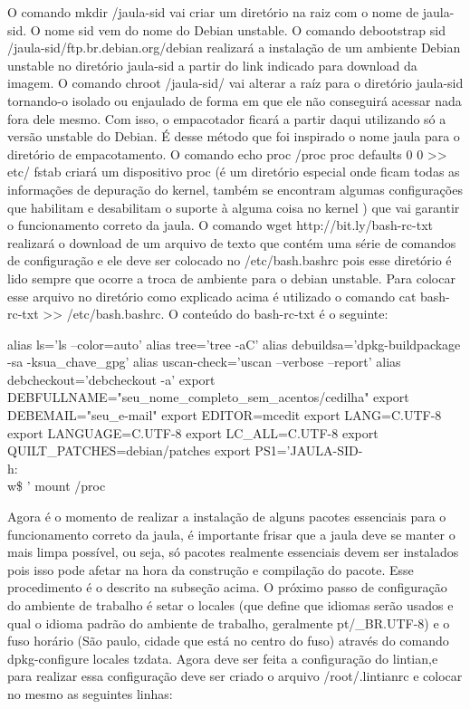 O comando mkdir /jaula-sid vai criar um diretório na raiz com o nome de jaula-sid. O nome sid vem do nome do Debian unstable. O comando debootstrap sid /jaula-sid/ftp.br.debian.org/debian realizará a instalação de um ambiente Debian unstable no diretório jaula-sid a partir do link indicado para download da imagem. O comando chroot /jaula-sid/ vai alterar a raíz para o diretório jaula-sid tornando-o isolado ou enjaulado de forma em que ele não conseguirá acessar nada fora dele mesmo. Com isso, o empacotador ficará a partir daqui utilizando só a versão unstable do Debian. É desse método que foi inspirado o nome jaula para o diretório de empacotamento. O comando echo proc /proc proc defaults 0 0 >> etc/ fstab  criará um dispositivo proc (é um diretório especial onde ficam todas as informações de depuração do kernel, também se encontram algumas configurações que habilitam e desabilitam o suporte à alguma coisa no kernel ) que vai garantir o funcionamento correto da jaula. O comando wget http://bit.ly/bash-rc-txt realizará o download de um arquivo de texto que contém uma série de comandos de configuração e ele deve ser colocado no /etc/bash.bashrc pois esse diretório é lido sempre que ocorre a troca de ambiente para o debian unstable. Para colocar esse arquivo no diretório como explicado acima é utilizado o comando cat bash-rc-txt >> /etc/bash.bashrc. O conteúdo do bash-rc-txt é o seguinte:

alias ls='ls --color=auto' 
alias tree='tree -aC' 
alias debuildsa='dpkg-buildpackage -sa -ksua\_chave\_gpg' 
alias uscan-check='uscan --verbose --report' 
alias debcheckout='debcheckout -a' 
export DEBFULLNAME="seu\_nome\_completo\_sem\_acentos/cedilha" 
export DEBEMAIL="seu\_e-mail" export EDITOR=mcedit export LANG=C.UTF-8 export LANGUAGE=C.UTF-8 
export LC\_ALL=C.UTF-8 
export QUILT\_PATCHES=debian/patches 
export PS1='JAULA-SID-\u@\\h:\\w\$ ' 
mount /proc 

Agora é o momento de realizar a instalação de alguns pacotes essenciais para o funcionamento correto da jaula, é importante frisar que a jaula deve se manter o mais limpa possível, ou seja, só pacotes realmente essenciais devem ser instalados pois isso pode afetar na hora da construção e compilação do pacote. Esse procedimento é o descrito na subseção acima. O próximo passo de configuração do ambiente de trabalho é setar o locales (que define que idiomas serão usados e qual o idioma padrão do ambiente de trabalho, geralmente pt/_BR.UTF-8) e o fuso horário (São paulo, cidade que está no centro do fuso) através do comando dpkg-configure locales tzdata. Agora deve ser feita a configuração do lintian,e para realizar essa configuração deve ser criado o arquivo /root/.lintianrc e colocar no mesmo as seguintes linhas: 

